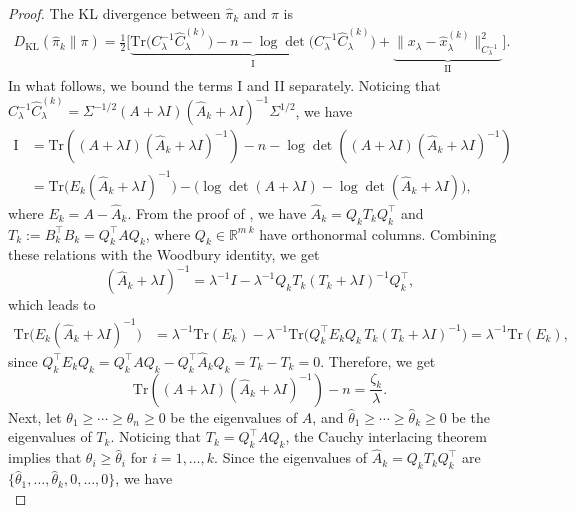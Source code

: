 \documentclass[]{myarticle}
\begin{document}
\begin{proof}
  The KL divergence between $\widehat{\pi}_{k}$ and $\pi$ is 
  \begin{align*}
    D_{\mathrm{KL}}(\widehat\pi_k\|\pi)
    = \frac{1}{2}\Big[\underbrace{\mathrm{Tr}\!\big(C_\lambda^{-1}\widehat C_\lambda^{(k)}\big)-n-\log\det\!\big(C_\lambda^{-1}\widehat C_\lambda^{(k)}\big)}_{\text{I}} + \underbrace{\|x_\lambda-\widehat x_\lambda^{(k)}\|_{C_\lambda^{-1}}^2}_{\text{II}}\Big].
  \end{align*}
  In what follows, we bound the terms I and II separately.
  Noticing that $C_\lambda^{-1}\widehat C_\lambda^{(k)}=\Sigma^{-1/2}(A+\lambda I)(\widehat A_k+\lambda I)^{-1}\Sigma^{1/2}$, we have 
  \begin{align*}
    \text{I} 
    &= \mathrm{Tr}((A+\lambda I)(\widehat{A}_k+\lambda I)^{-1}) - n - \log\det((A+\lambda I)(\widehat{A}_k+\lambda I)^{-1}) \\
    &= \mathrm{Tr}\big(E_k(\widehat A_k+\lambda I)^{-1}\big) -\Big(\log\det(A+\lambda I)-\log\det(\widehat A_k+\lambda I)\Big) ,
  \end{align*}
  where $E_{k}=A-\widehat A_k$. From the proof of , we have $\widehat A_k=Q_kT_kQ_k^\top$ and $T_k:=B_{k}^{\top}B_{k}=Q_k^\top A Q_k$, where $Q_k\in\mathbb{R}^{m\ k}$ have orthonormal columns. Combining these relations with the Woodbury identity, we get 
  \[(\widehat A_k+\lambda I)^{-1} = \lambda^{-1}I-\lambda^{-1}Q_kT_k(T_k+\lambda I)^{-1}Q_k^\top,\]
  which leads to 
  \begin{align*}
    \mathrm{Tr}\big(E_k(\widehat A_k+\lambda I)^{-1}\big)
    &= \lambda^{-1}\mathrm{Tr}(E_k)-\lambda^{-1}\mathrm{Tr}\Big(Q_k^\top E_k Q_k\,T_k(T_k+\lambda I)^{-1}\Big) = \lambda^{-1}\mathrm{Tr}(E_k),
  \end{align*}
  since $Q_k^\top E_k Q_k = Q_k^\top A Q_k-Q_k^\top \widehat A_k Q_k = T_k-T_k=0$. Therefore, we get 
  \begin{equation*}
    \mathrm{Tr}((A+\lambda I)(\widehat{A}_k+\lambda I)^{-1}) - n = \frac{\zeta_k}{\lambda}.
  \end{equation*}
  Next, let \(\theta_1\ge \cdots \ge \theta_n\ge 0\) be the eigenvalues of \(A\), and \(\hat{\theta}_1\ge \cdots \ge \hat{\theta}_k\ge 0\) be the eigenvalues of \(T_k\). Noticing that $T_k=Q_k^\top A Q_k$, the Cauchy interlacing theorem \cite{horn2012matrix} implies that $\theta_i\ge\hat{\theta}_i$ for $i=1,\dots,k$. Since the eigenvalues of \(\widehat A_k=Q_kT_kQ_k^\top\) are \(\{\hat{\theta}_1,\dots,\hat{\theta}_k,0,\dots,0\}\), we have
  \begin{equation*}

\end{equation*}
\end{proof}
\end{document}
